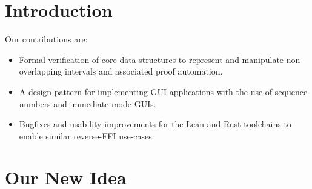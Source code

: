 \documentclass[review, anonymous, sigplan]{acmart}
\begin{document}

\fi

\maketitle

\section{Introduction}


Our contributions are:
\begin{itemize}
\item Formal verification of core data structures to represent and manipulate non-overlapping intervals and associated proof automation.
\item A design pattern for implementing GUI applications with the use of sequence numbers and immediate-mode GUIs.
\item Bugfixes and usability improvements for the Lean and Rust toolchains to enable similar reverse-FFI use-cases.
\end{itemize}

\section{Our New Idea}
\lipsum[1]
\end{document}
